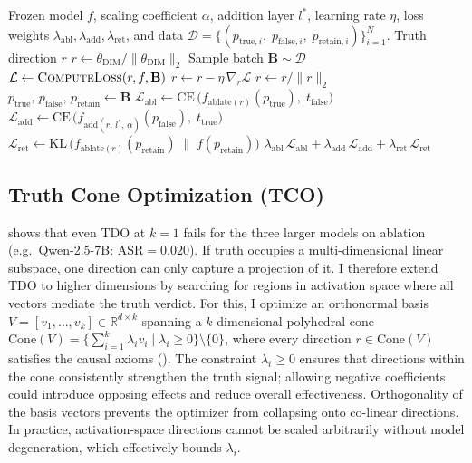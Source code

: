 \documentclass[sn-basic]{sn-jnl}
\begin{document}
\begin{algorithm}[t]
\caption{Truth Direction Optimization (TDO)}
\label{alg:tdo}
\begin{algorithmic}[1]
\Require Frozen model $f$, scaling coefficient $\alpha$, addition layer $l^{*}$,
  learning rate $\eta$, loss weights $\lambda_{\text{abl}},
  \lambda_{\text{add}}, \lambda_{\text{ret}}$, and data $\mathcal{D} =
  \{(p_{\text{true},i},\; p_{\text{false},i},\;
  p_{\text{retain},i})\}_{i=1}^{N}$.
\Ensure Truth direction $r$
\State $r \leftarrow \theta_{\text{DIM}} / \|\theta_{\text{DIM}}\|_2$
  \State Sample batch $\mathbf{B} \sim \mathcal{D}$
  \State $\mathcal{L} \leftarrow \textsc{ComputeLoss}(r, f, \mathbf{B})$
  \State $r \leftarrow r - \eta\, \nabla_{r} \mathcal{L}$
  \State $r \leftarrow r / \|r\|_2$
\EndWhile \\
  \State $p_{\text{true}},\, p_{\text{false}},\, p_{\text{retain}} \leftarrow
    \mathbf{B}$
  \State $\mathcal{L}_{\text{abl}} \leftarrow
    \mathrm{CE}\,\bigl(f_{\text{ablate}(r)}(p_{\text{true}}),\;
    t_{\text{false}}\bigr)$
  \State $\mathcal{L}_{\text{add}} \leftarrow
    \mathrm{CE}\,\bigl(f_{\text{add}(r,\,l^{*},\,\alpha)}(p_{\text{false}}),\;
    t_{\text{true}}\bigr)$
  \State $\mathcal{L}_{\text{ret}} \leftarrow
    \mathrm{KL}\,\bigl(f_{\text{ablate}(r)}(p_{\text{retain}})\;\|\;
    f(p_{\text{retain}})\bigr)$
  \State \Return $\lambda_{\text{abl}}\,\mathcal{L}_{\text{abl}} +
    \lambda_{\text{add}}\,\mathcal{L}_{\text{add}} +
    \lambda_{\text{ret}}\,\mathcal{L}_{\text{ret}}$
\EndFunction
\end{algorithmic}
\end{algorithm}


\subsection{Truth Cone Optimization (TCO)}
\label{sec:tco}

 shows that even TDO at $k = 1$ fails for the three larger
models on ablation (e.g.\ Qwen-2.5-7B: $\mathrm{ASR} = 0.020$). If truth
occupies a multi-dimensional linear subspace, one direction can only capture a
projection of it. I therefore extend TDO to higher dimensions by searching for
regions in activation space where all vectors mediate the truth verdict. For
this, I optimize an orthonormal basis $V = [v_1, \ldots, v_k] \in \mathbb{R}^{d
\times k}$ spanning a $k$-dimensional polyhedral cone $\mathrm{Cone}(V) =
\{\sum_{i=1}^{k} \lambda_i v_i \mid \lambda_i \ge 0\} \setminus \{0\}$, where
every direction $r \in \mathrm{Cone}(V)$ satisfies the causal axioms
(). The constraint $\lambda_i \ge 0$ ensures that directions
within the cone consistently strengthen the truth signal; allowing negative
coefficients could introduce opposing effects and reduce overall effectiveness.
Orthogonality of the basis vectors prevents the optimizer from collapsing onto
co-linear directions. In practice, activation-space directions cannot be scaled
arbitrarily without model degeneration, which effectively bounds $\lambda_i$.
\end{document}
